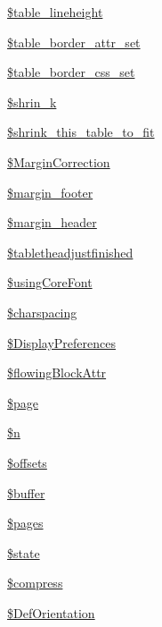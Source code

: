 \begin{DoxyCompactItemize}
\item 
\hyperlink{classm_p_d_f_a46acbe0f355e53a533c18bbcb9015fda}{\$table\-\_\-lineheight}
\item 
\hyperlink{classm_p_d_f_abb90edf22f4bdfa34c5fdf3a291e907a}{\$table\-\_\-border\-\_\-attr\-\_\-set}
\item 
\hyperlink{classm_p_d_f_a672eb78627946caac7a72bf50d03c9b9}{\$table\-\_\-border\-\_\-css\-\_\-set}
\item 
\hyperlink{classm_p_d_f_aeb05fd592a8c5a8649c4c65f2523bfdc}{\$shrin\-\_\-k}
\item 
\hyperlink{classm_p_d_f_af7713d9bb414f2d694f1e2ba40fb377d}{\$shrink\-\_\-this\-\_\-table\-\_\-to\-\_\-fit}
\item 
\hyperlink{classm_p_d_f_ae7c3fb9b5dba8965f8169a13d14f2b82}{\$\-Margin\-Correction}
\item 
\hyperlink{classm_p_d_f_a8f94f907cccaf945fa9d8d002838199a}{\$margin\-\_\-footer}
\item 
\hyperlink{classm_p_d_f_ae6055d68ab3f623343f64e8a8589fab2}{\$margin\-\_\-header}
\item 
\hyperlink{classm_p_d_f_a4a981c285c96c6a28319c3b7483d5770}{\$tabletheadjustfinished}
\item 
\hyperlink{classm_p_d_f_aa25b3fb0d9b5b95b9ccbe08c1a5077be}{\$using\-Core\-Font}
\item 
\hyperlink{classm_p_d_f_a2f078e826d29f4d4e6aeb9319a6e4f5f}{\$charspacing}
\item 
\hyperlink{classm_p_d_f_a4692283db31af9b4d0ddca95f2ab0d99}{\$\-Display\-Preferences}
\item 
\hyperlink{classm_p_d_f_abf66af5e929366cc04ad79c3579b51aa}{\$flowing\-Block\-Attr}
\item 
\hyperlink{classm_p_d_f_a99da7fd280cc0e8ade374d3522eb9d8c}{\$page}
\item 
\hyperlink{classm_p_d_f_a825893cb789f1a8845d65b8eea50f2eb}{\$n}
\item 
\hyperlink{classm_p_d_f_adf1731e55063c789e9e388f917b11986}{\$offsets}
\item 
\hyperlink{classm_p_d_f_a2024c7a11408480ff7797e1bfa56ff53}{\$buffer}
\item 
\hyperlink{classm_p_d_f_ab2122e2377682bed0ef2c9c10f2b4487}{\$pages}
\item 
\hyperlink{classm_p_d_f_a5f98ecb221ba30830180085f78d82b07}{\$state}
\item 
\hyperlink{classm_p_d_f_ac60b8b6b9c2e0b291aa6ec4aa57a302b}{\$compress}
\item 
\hyperlink{classm_p_d_f_a5d3f2a23df13a63ba4361487560acf81}{\$\-Def\-Orientation}

\end{DoxyCompactItemize}
